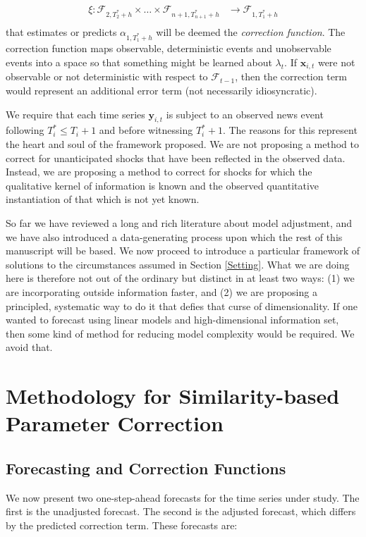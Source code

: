 \documentclass[11pt]{article}
\newcommand{\y}{\textbf{y}}
\newcommand{\x}{\textbf{x}}
\theoremstyle{definition}
\begin{document}
\begin{align*}
  \xi \colon \mathcal{F}_{2,T^{*}_{2}+h} \times \ldots \times \mathcal{F}_{n+1, T^{*}_{n+1}+h} &\to \mathcal{F}_{1,T^{*}_{1}+h}\\
\end{align*}
that estimates or predicts $\alpha_{1,T^{*}_{1}+h}$ will be deemed the \textit{correction function}.  The correction function maps observable, deterministic events and unobservable events into a space so that something might be learned about $\lambda_{t}$.  If $\x_{i,t}$ were not observable or not deterministic with respect to $\mathcal{F}_{t-1}$, then the correction term would represent an additional error term (not necessarily idiosyncratic).

We require that each time series $\y_{i,t}$ is subject to an observed news event following $T^*_i \leq T_{i} + 1$ and before witnessing $T^*_i+1$.  The reasons for this represent the heart and soul of the framework proposed.  We are not proposing a method to correct for unanticipated shocks that have been reflected in the observed data.  Instead, we are proposing a method to correct for shocks for which the qualitative kernel of information is known and the observed quantitative instantiation of that which is not yet known. 

So far we have reviewed a long and rich literature about model adjustment, and we have also introduced a data-generating process upon which the rest of this manuscript will be based.  We now proceed to introduce a particular framework of solutions to the circumstances assumed in Section \ref{Setting}.  What we are doing here is therefore not out of the ordinary but distinct in at least two ways: (1) we are incorporating outside information faster, and (2) we are proposing a principled, systematic way to do it that defies that curse of dimensionality.  If one wanted to forecast using linear models and high-dimensional information set, then some kind of method for reducing model complexity would be required.  We avoid that.

\section{Methodology for Similarity-based Parameter Correction}
\subsection{Forecasting and Correction Functions}

We now present two one-step-ahead forecasts for the time series under study. The first is the unadjusted forecast. The second is the adjusted forecast, which differs by the predicted correction term.  These forecasts are: 
\end{document}

